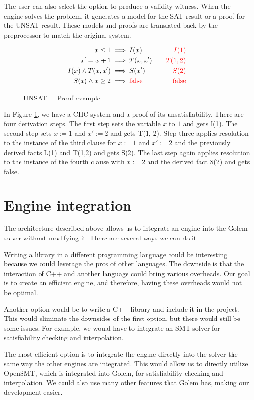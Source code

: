 The user can also select the option to produce a validity witness. When the engine solves the problem, it generates a model for the SAT result or a proof for the UNSAT result. These models and proofs are translated back by the preprocessor to match the original system.

\begin{figure}[H]
\begin{align*}
    x \leq 1 &\implies I(x) \quad &\text{\color{red}{\(I(1)\)}} \\
    x' = x + 1 &\implies T(x, x') \quad &\text{\color{red}{\(T(1, 2)\)}} \\
    I(x) \land T(x, x') &\implies S(x') \quad &\text{\color{red}{\(S(2)\)}} \\
    S(x) \land x \geq 2 &\implies \text{\color{red}{false}} \quad &\text{\color{red}{false}}
\end{align*}
    \caption{UNSAT + Proof example}\label{ex:UNSAT}
\end{figure}

In Figure \ref{ex:UNSAT}, we have a CHC system and a proof of its unsatisfiability. There are four derivation steps. The first step sets the variable $x$ to $1$ and gets I(1). The second step sets $x := 1$ and $x' := 2$ and gets T(1, 2). Step three applies resolution to the instance of the third clause for $x := 1$ and $x' := 2$ and the previously derived facts L(1) and T(1,2) and gets S(2). The last step again applies resolution to the instance of the fourth clause with $x := 2$ and the derived fact S(2) and gets false. 


\section{Engine integration}
\noindent The architecture described above allows us to integrate an engine into the Golem solver without modifying it. There are several ways we can do it. 

Writing a library in a different programming language could be interesting because we could leverage the pros of other languages. The downside is that the interaction of C++ and another language could bring various overheads. Our goal is to create an efficient engine, and therefore, having these overheads would not be optimal.

Another option would be to write a C++ library and include it in the project. This would eliminate the downsides of the first option, but there would still be some issues. For example, we would have to integrate an SMT solver for satisfiability checking and interpolation. 

The most efficient option is to integrate the engine directly into the solver the same way the other engines are integrated. This would allow us to directly utilize OpenSMT, which is integrated into Golem, for satisfiability checking and interpolation. We could also use many other features that Golem has, making our development easier.


